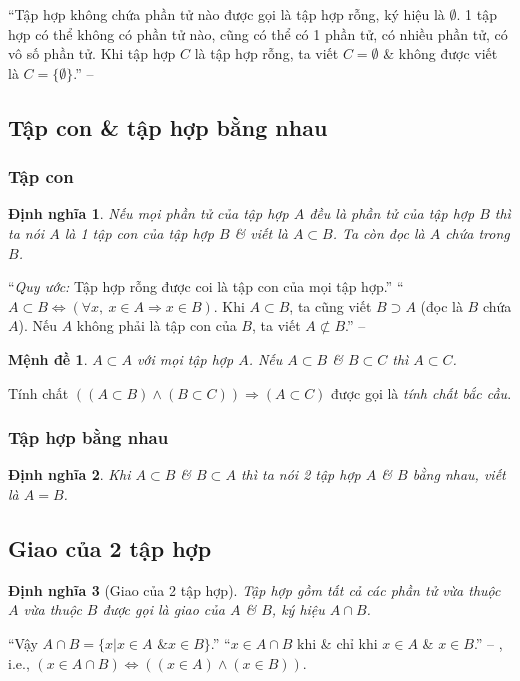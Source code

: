 \documentclass[oneside]{book}
\numberwithin{equation}{section}
\newtheorem{dinhnghia}{Định nghĩa}[section]
\newtheorem{menhde}{Mệnh đề}[section]
\begin{document}
``Tập hợp không chứa phần tử nào được gọi là tập hợp rỗng, ký hiệu là $\emptyset$. 1 tập hợp có thể không có phần tử nào, cũng có thể có 1 phần tử, có nhiều phần tử, có vô số phần tử. Khi tập hợp $C$ là tập hợp rỗng, ta viết $C = \emptyset$ \& không được viết là $C = \{\emptyset\}$.'' -- \cite[p. 13]{SGK_Toan_10_Canh_Dieu_tap_1}

\subsection{Tập con \& tập hợp bằng nhau}

\subsubsection{Tập con}

\begin{dinhnghia}
	Nếu mọi phần tử của tập hợp $A$ đều là phần tử của tập hợp $B$ thì ta nói $A$ là 1 \emph{tập con} của tập hợp $B$ \& viết là $A\subset B$. Ta còn đọc là $A$ chứa trong $B$.
\end{dinhnghia}
``\textit{Quy ước:} Tập hợp rỗng được coi là tập con của mọi tập hợp.'' ``$A\subset B\Leftrightarrow(\forall x,\ x\in A\Rightarrow x\in B)$. Khi $A\subset B$, ta cũng viết $B\supset A$ (đọc là $B$ chứa $A$). Nếu $A$ không phải là tập con của $B$, ta viết $A\not\subset B$.'' -- \cite[p. 13]{SGK_Toan_10_Canh_Dieu_tap_1}

\begin{menhde}
	$A\subset A$ với mọi tập hợp $A$. Nếu $A\subset B$ \& $B\subset C$ thì $A\subset C$.
\end{menhde}
Tính chất $((A\subset B)\land(B\subset C))\Rightarrow(A\subset C)$ được gọi là \textit{tính chất bắc cầu}.

\subsubsection{Tập hợp bằng nhau}

\begin{dinhnghia}
	Khi $A\subset B$ \& $B\subset A$ thì ta nói 2 tập hợp $A$ \& $B$ \emph{bằng nhau}, viết là $A = B$.
\end{dinhnghia}

\subsection{Giao của 2 tập hợp}

\begin{dinhnghia}[Giao của 2 tập hợp]
	Tập hợp gồm tất cả các phần tử vừa thuộc $A$ vừa thuộc $B$ được gọi là \emph{giao} của $A$ \& $B$, ký hiệu $A\cap B$.
\end{dinhnghia}
``Vậy $A\cap B = \{x|x\in A\mbox{ \& } x\in B\}$.'' ``$x\in A\cap B$ khi \& chỉ khi $x\in A$ \& $x\in B$.'' -- \cite[p. 14]{SGK_Toan_10_Canh_Dieu_tap_1}, i.e., $(x\in A\cap B)\Leftrightarrow((x\in A)\land(x\in B))$.
\end{document}

